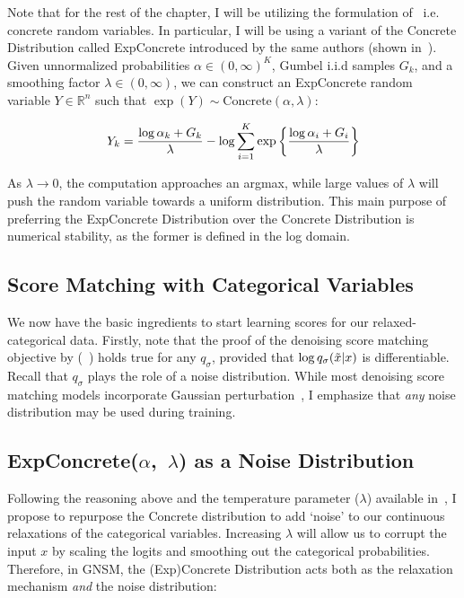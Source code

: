 Note that for the rest of the chapter, I will be utilizing the formulation of~\cite{maddison2017concrete} i.e. concrete random variables. In particular, I will be using a variant of the Concrete Distribution called ExpConcrete introduced by the same authors (shown in~). Given unnormalized probabilities $\alpha \in (0, \infty)^K$, Gumbel i.i.d samples $\mathit{G}_k$, and a smoothing factor $\lambda \in (0, \infty)$, we can construct an ExpConcrete random variable $Y \in \mathbb{R}^n$ such that $\exp(Y) \sim \text{Concrete}(\alpha, \lambda) $:

\begin{equation}
    Y_k = \frac{\log \alpha_k + G_k}{\lambda} - \log \sum_{i=1}^{K} \exp \left\{ {\frac{\log \alpha_i + G_i}{\lambda}} \right\}
    \label{eq:log_concrete}
\end{equation}

As $\lambda \rightarrow 0$, the computation approaches an argmax, while large values of $\lambda$ will push the random variable towards a uniform distribution. This main purpose of preferring the ExpConcrete Distribution over the Concrete Distribution is numerical stability, as the former is defined in the log domain.


\subsection*{Score Matching with Categorical Variables}

We now have the basic ingredients to start learning scores for our relaxed-categorical data.
Firstly, note that the proof of the denoising score matching objective by \cite{vincent2011connection} (~) holds true for any $q_\sigma$, provided that $\log q_{\sigma}(\Tilde{x} |x)$ is differentiable.
Recall that $q_\sigma$ plays the role of a noise distribution. While most denoising score matching models incorporate Gaussian perturbation~\cite{Song2019,song2020score,vincent2011connection}, I emphasize that \textit{any} noise distribution may be used during training.

\subsection*{ExpConcrete($\alpha$,~$\lambda$) as a Noise Distribution}
\label{combine}

Following the reasoning above and the temperature parameter ($\lambda$) available in~, I propose to repurpose the Concrete distribution to add `noise' to our continuous relaxations of the categorical variables. Increasing $\lambda$ will allow us to corrupt the input $x$ by scaling the logits and smoothing out the categorical probabilities. Therefore, in GNSM, the (Exp)Concrete Distribution acts both as the relaxation mechanism \textit{and} the noise distribution:

